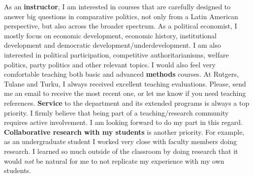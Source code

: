 \documentclass[10pt,stdletter,dateno,sigleft]{newlfm} %
\begin{document}
\begin{newlfm}

As an {\bf instructor}, I am interested in courses that are carefully designed to answer big questions in comparative politics, not only from a Latin American perspective, but also across the broader spectrum. As a political economist, I mostly focus on economic development, economic history, institutional development and democratic development/underdevelopment. I am also interested in political participation, competitive authoritarianisms, welfare politics, party politics and other relevant topics. I would also feel very comfortable teaching both basic and advanced {\bf methods} courses. At Rutgers, Tulane and Turku, I always received excellent teaching evaluations. Please, send me an email to receive the most recent one, or let me know if you need teaching references. {\bf Service} to the department and its extended programs is always a top priority. I firmly believe that being part of a teaching/research community requires active involvement. I am looking forward to do my part in this regard. {\bf Collaborative research with my students} is another priority. For example, as an undergraduate student I worked very close with faculty members doing research. I learned so much outside of the classroom by doing research that it would \emph{not} be natural for me to not replicate my experience with my own students.




\end{newlfm}
\end{document}
